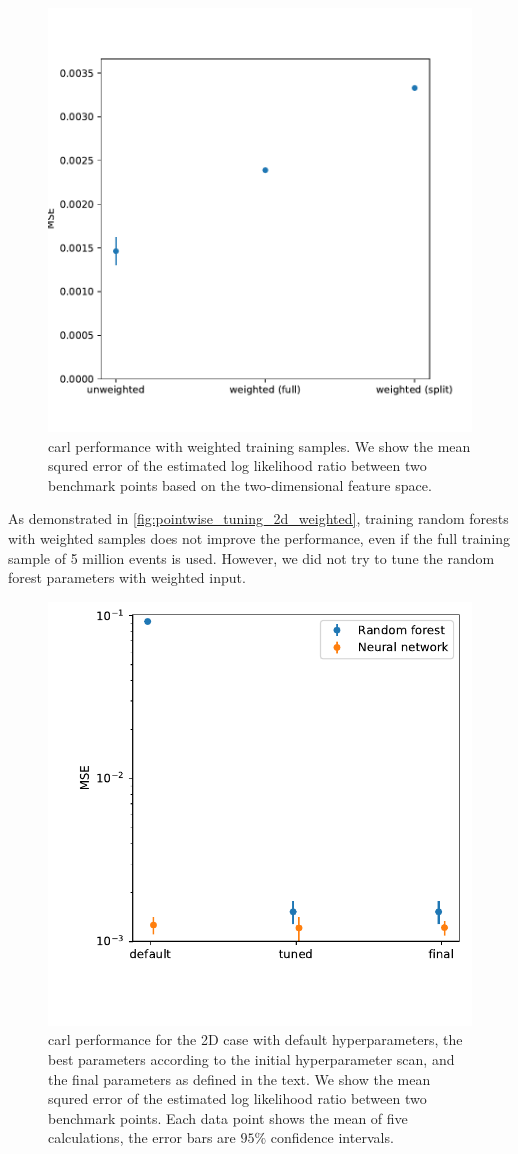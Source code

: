 \begin{figure}
  \includegraphics[height=0.45\textwidth]{figures/appendix/pointwise_tuning_2d/mse_weighted_events.pdf}%
  \caption{carl performance with weighted training samples. We show
    the mean squred error of the estimated log likelihood ratio between
    two benchmark points based on the two-dimensional feature
    space.}
  \label{fig:pointwise_tuning_2d_weighted}
\end{figure}

As demonstrated in \autoref{fig:pointwise_tuning_2d_weighted},
training random forests with weighted samples does not improve the
performance, even if the full training sample of 5 million events is
used. However, we did not try to tune the random forest parameters
with weighted input.

\begin{figure}
  \includegraphics[height=0.45\textwidth]{figures/appendix/pointwise_tuning_2d/mse_final.pdf}%
  \caption{carl performance for the 2D case with 
    default hyperparameters, the best parameters according to the
    initial hyperparameter scan, and the final parameters as defined
    in the text. We show the mean squred error of the estimated log
    likelihood ratio between two benchmark points. Each data point
    shows the mean of five calculations, the error bars are $95\%$
    confidence intervals.}
  \label{fig:pointwise_tuning_2d_final}
\end{figure}

